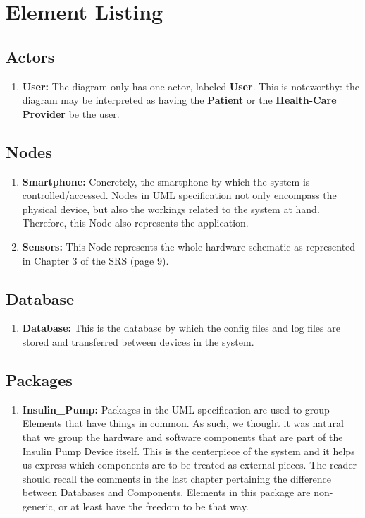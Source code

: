 \documentclass{scrreprt}
\begin{document}
\section{Element Listing}
\subsection{Actors}
\begin{enumerate}
    \item \textbf{User:} The diagram only has one actor, labeled \textbf{User}. This is noteworthy: the diagram may be interpreted as having the \textbf{Patient} or the \textbf{Health-Care Provider} be the user.
\end{enumerate}
\subsection{Nodes}
\begin{enumerate}
    \item \textbf{Smartphone:} Concretely, the smartphone by which the system is controlled/accessed. Nodes in UML specification not only encompass the physical device, but also the workings related to the system at hand.
        Therefore, this Node also represents the application.
    \item \textbf{Sensors:} This Node represents the whole hardware schematic as represented in Chapter 3 of the SRS (page 9). 
\end{enumerate}
\subsection{Database}
\begin{enumerate}
    \item \textbf{Database:} This is the database by which the config files and log files are stored and transferred between devices in the system.
\end{enumerate}
\subsection{Packages}
\begin{enumerate}
    \item \textbf{Insulin\_Pump:} Packages in the UML specification are used to group Elements that have things in common. As such, we thought it was natural that we group the hardware and software components that are
        part of the Insulin Pump Device itself. This is the centerpiece of the system and it helps us express which components are to be treated as external pieces. The reader should recall the comments in the last 
        chapter pertaining the difference between Databases and Components. Elements in this package are non-generic, or at least have the freedom to be that way. 
\end{enumerate}
\end{document}
